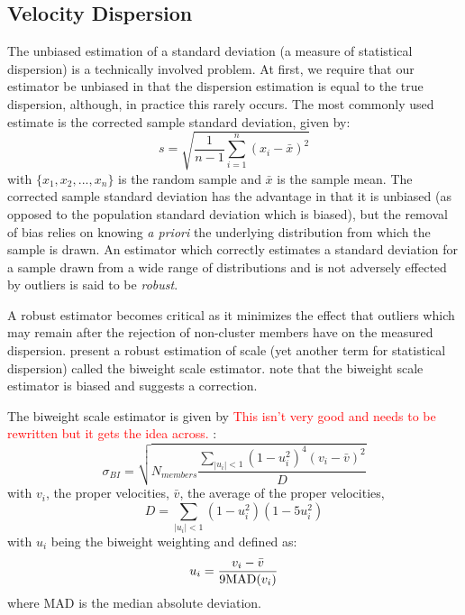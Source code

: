 \documentclass[apj, twocolappendix]{emulateapj}
\newcommand{\editorial}[1]{\textcolor{red}{#1} }
\begin{document}
\subsection{Velocity Dispersion}
The unbiased estimation of a standard deviation (a measure of statistical dispersion) is a technically involved problem. At first, we require that our estimator be unbiased in that the dispersion estimation is equal to the true dispersion, although, in practice this rarely occurs. The most commonly used estimate is the corrected sample standard deviation, given by:
\begin{equation}
	s = \sqrt{\frac{1}{n-1} \sum_{i=1}^n (x_i - \bar{x})^2}
\end{equation}
with $\{x_1, x_2, ..., x_n\}$ is the random sample and $\bar{x}$ is the sample mean. The corrected sample standard deviation has the advantage in that it is unbiased (as opposed to the population standard deviation which is biased), but the removal of bias relies on knowing \textit{a priori} the underlying distribution from which the sample is drawn. An estimator which correctly estimates a standard deviation for a sample drawn from a wide range of distributions and is not adversely effected by outliers is said to be \textit{robust}.

A robust estimator becomes critical as it minimizes the effect that outliers which may remain after the rejection of non-cluster members have on the measured dispersion. \cite{Beers1990} present a robust estimation of scale (yet another term for statistical dispersion) called the biweight scale estimator. \cite{Ruel2014} note that the biweight scale estimator is biased and suggests a correction. 

The biweight scale estimator is given by \editorial{This isn't very good and needs to be rewritten but it gets the idea across.}:
\begin{equation}
	\sigma_{BI} = \sqrt{ N_{members} \frac{ \sum_{|u_i|<1} (1-u_i^2)^4 (v_i - \bar{v})^2} {D} }
\end{equation}
with $v_i$, the proper velocities, $\bar{v}$, the average of the proper velocities,
\begin{equation}
	D = \sum_{|u_i|<1} (1-u_i^2)(1-5u_i^2)
\end{equation}
with $u_i$ being the biweight weighting and defined as:
\begin{equation}
	u_i = \frac{v_i - \bar{v}}{9 {\rm MAD}(v_i)}
\end{equation}
where MAD is the median absolute deviation.
\end{document}
